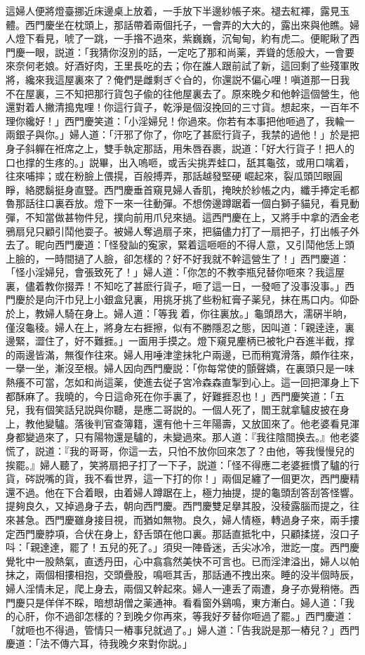 這婦人便將燈臺挪近床邊桌上放着，一手放下半邊紗帳子來。褪去紅褌，露見玉體。西門慶坐在枕頭上，那話帶着兩個托子，一會弄的大大的，露出來與他瞧。婦人燈下看見，唬了一跳，一手揝不過來，紫巍巍，沉甸甸，約有虎二。便眤瞅了西門慶一眼，説道：「我猜你沒別的話，一定吃了那和尚薬，弄聳的恁般大，一會要來奈何老娘。好酒好肉，王里長吃的去；你在誰人跟前試了新，這回剩了些殘軍敗將，纔來我這屋裏來了？俺們是雌剩ぎぐ㒲的，你還説不偏心哩！嗔道那一日我不在屋裏，三不知把那行貨包子偸的往他屋裏去了。原來晚夕和他幹這個營生，他還對着人撇清搗鬼哩！你這行貨子，乾淨是個沒挽回的三寸貨。想起來，一百年不理你纔好！」西門慶笑道：「小淫婦兒！你過來。你若有本事把他咂過了，我輸一兩銀子與你。」婦人道：「汗邪了你了，你吃了甚麽行貨子，我禁的過他！」於是把身子斜軃在袵席之上，雙手執定那話，用朱唇吞裹，説道：「好大行貨子！把人的口也撑的生疼的。」説畢，出入嗚咂，或舌尖挑弄蛙口，舐其龜弦，或用口噙着，往來哺摔；或在粉臉上偎㨪，百般搏弄，那話越發堅硬𢳥崛起來，裂瓜頭凹眼圓睜，絡腮鬍挺身直豎。西門慶垂首窺見婦人香肌，掩映於紗帳之内，纖手捧定毛都魯那話往口裏吞放。燈下一來一往動彈。不想傍邊蹲踞着一個白獅子貓兒，看見動彈，不知當做甚物件兒，撲向前用爪兒來撾。這西門慶在上，又將手中拿的洒金老鴉扇兒只顧引鬦他耍子。被婦人奪過扇子來，把貓儘力打了一扇把子，打出帳子外去了。眤向西門慶道：「怪發訕的寃家，緊着這咂咂的不得人意，又引鬦他恁上頭上臉的，一時間撾了人臉，卻怎樣的？好不好我就不幹這營生了！」西門慶道：「怪小淫婦兒，會張致死了！」婦人道：「你怎的不教李瓶兒替你咂來？我這屋裏，儘着教你掇弄！不知吃了甚麽行貨子，咂了這一日，一發咂了没事没事。」西門慶於是向汗巾兒上小銀盒兒裏，用挑牙挑了些粉紅膏子薬兒，抹在馬口内。仰卧於上，教婦人騎在身上。婦人道：「等我𢵞着，你往裏放。」龜頭昂大，濡硏半晌，僅沒龜稜。婦人在上，將身左右捱擦，似有不勝隱忍之態，因叫道：「親逹逹，裏邊緊，澀住了，好不難捱。」一面用手摸之。燈下窺見麈柄已被牝户吞進半截，撑的兩邊皆滿，無復作往來。婦人用唾津塗抹牝户兩邊，已而稍寬滑落，頗作往來，一擧一坐，漸沒至根。婦人因向西門慶説：「你每常使的顫聲嬌，在裏頭只是一味熱癢不可當，怎如和尚這薬，使進去従子宮冷森森直掣到心上。這一回把渾身上下都酥麻了。我曉的，今日這命死在你手裏了，好難捱忍也！」西門慶笑道：「五兒，我有個笑話兒説與你聽，是應二哥説的。一個人死了，閻王就拿驢皮披在身上，教他變驢。落後判官查簿籍，還有他十三年陽壽，又放囬來了。他老婆看見渾身都變過來了，只有陽物還是驢的，未變過來。那人道：『我往陰間换去。』他老婆慌了，説道：『我的哥哥，你這一去，只怕不放你回來怎了？由他，等我慢慢兒的挨罷。』婦人聽了，笑將扇把子打了一下子，説道：「怪不得應二老婆捱慣了驢的行貨，硶説嘴的貨，我不看世界，這一下打的你！」兩個足纏了一個更次，西門慶精還不過。他在下合着眼，由着婦人蹲踞在上，極力抽提，提的龜頭刮答刮答怪響。提夠良久，又掉過身子去，朝向西門慶。西門慶雙足擧其股，没稜露腦而提之，往來甚急。西門慶雖身接目視，而猶如無物。良久，婦人情極，轉過身子來，兩手摟定西門慶脖項，合伏在身上，舒舌頭在他口裏。那話直抵牝中，只顧揉搓，沒口子呌：「親達達，罷了！五兒的死了。」須臾一陣昏迷，舌尖冰冷，泄訖一度。西門慶覺牝中一股熱氣，直透丹田，心中翕翕然美快不可言也。已而淫津溢出，婦人以帕抹之，兩個相摟相抱，交頭疊股，鳴咂其舌，那話通不拽出來。睡的没半個時辰，婦人淫情未足，爬上身去，兩個又幹起來。婦人一連丢了兩遭，身子亦覺稍惓。西門慶只是佯佯不睬，暗想胡僧之薬通神。看看窗外鷄鳴，東方漸白。婦人道：「我的心肝，你不過卻怎樣的？到晚夕你再來，等我好歹替你咂過了罷。」西門慶道：「就咂也不得過，管情只一樁事兒就過了。」婦人道：「告我説是那一樁兒？」西門慶道：「法不傳六耳，待我晚夕來對你説。」

